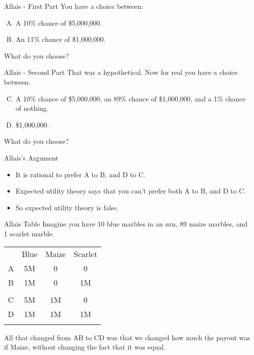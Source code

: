 \documentclass[
  ignorenonframetext,
]{beamer}
\providecommand{\tightlist}{%
  \setlength{\itemsep}{0pt}\setlength{\parskip}{0pt}}
\renewcommand{\,}{\text{, }}
\begin{document}
\begin{frame}{Allais - First Part}
\protect\hypertarget{allais---first-part}{}
You have a choice between:

\begin{enumerate}
[A.]
\tightlist
\item
  A 10\% chance of \$5,000,000.
\item
  An 11\% chance of \$1,000,000.
\end{enumerate}

What do you choose?
\end{frame}

\begin{frame}{Allais - Second Part}
\protect\hypertarget{allais---second-part}{}
That was a hypothetical. Now for real you have a choice between:

\begin{enumerate}
[A.]
\setcounter{enumi}{2}
\tightlist
\item
  A 10\% chance of \$5,000,000, an 89\% chance of \$1,000,000, and a 1\%
  chance of nothing.
\item
  \$1,000,000.
\end{enumerate}

What do you choose?
\end{frame}

\begin{frame}{Allais's Argument}
\protect\hypertarget{allaiss-argument}{}
\begin{itemize}
\tightlist
\item
  It is rational to prefer A to B, and D to C. \pause
\item
  Expected utility theory says that you can't prefer both A to B, and D
  to C. \pause
\item
  So expected utility theory is false.
\end{itemize}
\end{frame}

\begin{frame}{Allais Table}
\protect\hypertarget{allais-table}{}
Imagine you have 10 blue marbles in an urn, 89 maize marbles, and 1
scarlet marble.

\begin{longtable}[]{@{}cccc@{}}
\toprule
& Blue & Maize & Scarlet \\ \addlinespace
\midrule
\endhead
A & 5M & 0 & 0 \\ \addlinespace
B & 1M & 0 & 1M \\ \addlinespace
& & & \\ \addlinespace
C & 5M & 1M & 0 \\ \addlinespace
D & 1M & 1M & 1M \\ \addlinespace
\bottomrule
\end{longtable}

All that changed from AB to CD was that we changed how much the payout
was if Maize, without changing the fact that it was equal.
\end{frame}
\end{document}
